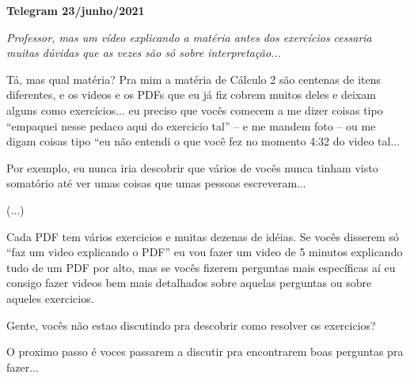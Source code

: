 \documentclass[oneside,12pt]{article}
\begin{document}
\newpage

%

{\bf Telegram 23/junho/2021}

\msk

{\sl Professor, mas um vídeo explicando a matéria antes dos exercícios
cessaria muitas dúvidas que as vezes são só sobre interpretação...}

\msk

Tá, mas qual matéria? Pra mim a matéria de Cálculo 2 são centenas de
itens diferentes, e os videos e os PDFs que eu já fiz cobrem muitos
deles e deixam alguns como exercícios... eu preciso que vocês comecem
a me dizer coisas tipo ``empaquei nesse pedaco aqui do exercicio tal''
-- e me mandem foto -- ou me digam coisas tipo ``eu não entendi o que
você fez no momento 4:32 do video tal...

Por exemplo, eu nunca iria descobrir que vários de vocês nunca tinham
visto somatório até ver umas coisas que umas pessoas escreveram...


\ssk

(...)

\ssk

Cada PDF tem vários exercicios e muitas dezenas de idéias. Se vocês
disserem só ``faz um video explicando o PDF'' eu vou fazer um video de
5 minutos explicando tudo de um PDF por alto, mas se vocês fizerem
perguntas mais específicas aí eu consigo fazer videos bem mais
detalhados sobre aquelas perguntas ou sobre aqueles exercicios.

Gente, vocês não estao discutindo pra descobrir como resolver
os exercicios?

O proximo passo é voces passarem a discutir pra encontrarem
boas perguntas pra fazer...
\end{document}

